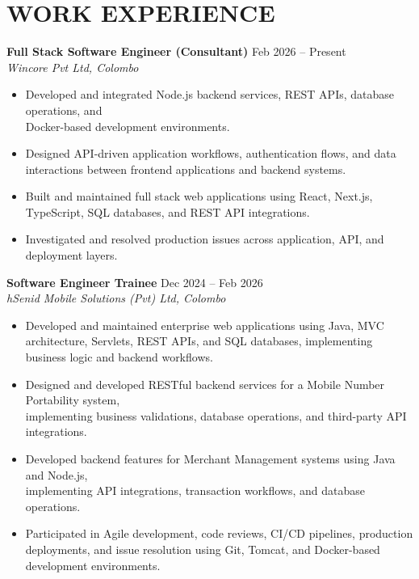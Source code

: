 \documentclass[12pt,a4paper]{article}
\begin{document}
\section*{WORK EXPERIENCE}

\noindent\textbf{Full Stack Software Engineer (Consultant)} \hfill Feb 2026 -- Present\\
\textit{Wincore Pvt Ltd, Colombo}

\begin{itemize}[leftmargin=*, itemsep=2pt, topsep=3pt]

\item Developed and integrated Node.js backend services, REST APIs, database operations, and \\Docker-based development environments.

\item Designed API-driven application workflows, authentication flows, and data interactions between frontend applications and backend systems.

\item Built and maintained full stack web applications using React, Next.js, TypeScript, SQL databases, and REST API integrations.

\item Investigated and resolved production issues across application, API, and deployment layers.

\end{itemize}

\vspace{6pt}

\noindent\textbf{Software Engineer Trainee} \hfill Dec 2024 -- Feb 2026\\
\textit{hSenid Mobile Solutions (Pvt) Ltd, Colombo}

\begin{itemize}[leftmargin=*, itemsep=2pt, topsep=3pt]
   \item Developed and maintained enterprise web applications using Java, MVC architecture, Servlets, REST APIs, and SQL databases, implementing business logic and backend workflows.
\item Designed and developed RESTful backend services for a Mobile Number Portability system, \\implementing business validations, database operations, and third-party API integrations.
\item Developed backend features for Merchant Management systems using Java and Node.js, \\implementing API integrations, transaction workflows, and database operations.
\item Participated in Agile development, code reviews, CI/CD pipelines, production deployments, and issue resolution using Git, Tomcat, and Docker-based development environments.
\end{itemize}
\end{document}
